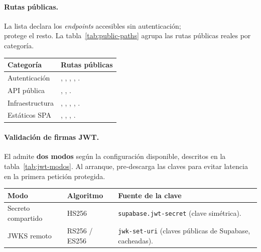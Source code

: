 \paragraph{Rutas públicas.} La lista  declara los \textit{endpoints}
accesibles sin autenticación; \\ 
 protege el resto. La
tabla~\ref{tab:public-paths} agrupa las rutas públicas reales por categoría.

\clearpage
\vspace{0.2cm}
\noindent
\renewcommand{\arraystretch}{1.3}
\fontsize{8}{9.6}\selectfont\sffamily
\begin{tabularx}{\textwidth}{|L{3.2cm}|Y|}
\hline
{}
\sffamily\textbf{Categoría} & \sffamily\textbf{Rutas públicas} \\
\hline
Autenticación & , , , , . \\
\hline
{}
API pública & , , . \\
\hline
Infraestructura & , , , , . \\
\hline
{}
Estáticos SPA & \pathbreak{/}, , , . \\
\hline
\end{tabularx}
\label{tab:public-paths}

\paragraph{Validación de firmas JWT.} El  admite \textbf{dos modos}
según la configuración disponible, descritos en la tabla~\ref{tab:jwt-modos}. Al arranque,
 pre-descarga las claves para evitar latencia en la primera
petición protegida.

\vspace{0.2cm}
\noindent
\renewcommand{\arraystretch}{1.3}
\fontsize{8.5}{10.2}\selectfont\sffamily
\begin{tabularx}{\textwidth}{|C{3.0cm}|C{2.6cm}|Y|}
\hline
{}
\sffamily\textbf{Modo} & \sffamily\textbf{Algoritmo} & \sffamily\textbf{Fuente de la clave} \\
\hline
Secreto compartido & HS256 & \texttt{supabase.jwt-secret} (clave simétrica). \\ \hline
{}
JWKS remoto & RS256 / ES256 & \texttt{jwk-set-uri} (claves públicas de Supabase, cacheadas). \\ \hline
\end{tabularx}
\label{tab:jwt-modos}


